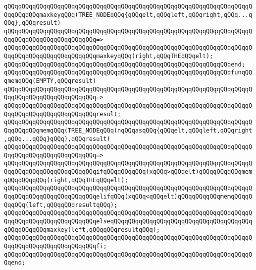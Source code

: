 \newline
\verb|qQQqqQQqqQQqqQQqqQQqqQQqqQQqqQQqqQQqqQQqqQQqqQQqqQQqqQQqqQQqqQQqqQQqqQQqqQQqqQQqmaxkeyqQQq(TREE_NODEqQQq{qQQqelt,qQQqleft,qQQqright,qQQq...qQQq},qQQqresult)|\newline
\verb|qQQqqQQqqQQqqQQqqQQqqQQqqQQqqQQqqQQqqQQqqQQqqQQqqQQqqQQqqQQqqQQqqQQqqQQqqQQqqQQqqQQqqQQqqQQqqQQq=>|\newline
\verb|qQQqqQQqqQQqqQQqqQQqqQQqqQQqqQQqqQQqqQQqqQQqqQQqqQQqqQQqqQQqqQQqqQQqqQQqqQQqqQQqqQQqqQQqqQQqqQQqmaxkeyqQQq(right,qQQqTHEqQQqelt);|\newline
\verb|qQQqqQQqqQQqqQQqqQQqqQQqqQQqqQQqqQQqqQQqqQQqqQQqqQQqqQQqqQQqqQQqend;|\newline
\newline
\verb|qQQqqQQqqQQqqQQqqQQqqQQqqQQqqQQqqQQqqQQqqQQqqQQqqQQqqQQqqQQqqQQqfunqQQqmemqQQq(EMPTY,qQQqresult)|\newline
\verb|qQQqqQQqqQQqqQQqqQQqqQQqqQQqqQQqqQQqqQQqqQQqqQQqqQQqqQQqqQQqqQQqqQQqqQQqqQQqqQQqqQQqqQQqqQQqqQQq=>|\newline
\verb|qQQqqQQqqQQqqQQqqQQqqQQqqQQqqQQqqQQqqQQqqQQqqQQqqQQqqQQqqQQqqQQqqQQqqQQqqQQqqQQqqQQqqQQqqQQqqQQqresult;|\newline
\newline
\verb|qQQqqQQqqQQqqQQqqQQqqQQqqQQqqQQqqQQqqQQqqQQqqQQqqQQqqQQqqQQqqQQqqQQqqQQqqQQqqQQqmemqQQq(TREE_NODEqQQq(nqQQqasqQQq{qQQqelt,qQQqleft,qQQqright,qQQq...qQQq}qQQq),qQQqresult)|\newline
\verb|qQQqqQQqqQQqqQQqqQQqqQQqqQQqqQQqqQQqqQQqqQQqqQQqqQQqqQQqqQQqqQQqqQQqqQQqqQQqqQQqqQQqqQQqqQQqqQQq=>|\newline
\verb|qQQqqQQqqQQqqQQqqQQqqQQqqQQqqQQqqQQqqQQqqQQqqQQqqQQqqQQqqQQqqQQqqQQqqQQqqQQqqQQqqQQqqQQqqQQqqQQqifqQQqqQQqqQQq(xqQQq>qQQqelt)qQQqqQQqqQQqmemqQQqqQQqqQQq(right,qQQqTHEqQQqelt);|\newline
\verb|qQQqqQQqqQQqqQQqqQQqqQQqqQQqqQQqqQQqqQQqqQQqqQQqqQQqqQQqqQQqqQQqqQQqqQQqqQQqqQQqqQQqqQQqqQQqqQQqelifqQQq(xqQQq<qQQqelt)qQQqqQQqqQQqmemqQQqqQQqqQQq(left,qQQqqQQqresultqQQq);|\newline
\verb|qQQqqQQqqQQqqQQqqQQqqQQqqQQqqQQqqQQqqQQqqQQqqQQqqQQqqQQqqQQqqQQqqQQqqQQqqQQqqQQqqQQqqQQqqQQqqQQqelseqQQqqQQqqQQqqQQqqQQqqQQqqQQqqQQqqQQqqQQqqQQqqQQqqQQqmaxkey(left,qQQqqQQqresultqQQq);|\newline
\verb|qQQqqQQqqQQqqQQqqQQqqQQqqQQqqQQqqQQqqQQqqQQqqQQqqQQqqQQqqQQqqQQqqQQqqQQqqQQqqQQqqQQqqQQqqQQqqQQqfi;|\newline
\verb|qQQqqQQqqQQqqQQqqQQqqQQqqQQqqQQqqQQqqQQqqQQqqQQqqQQqqQQqqQQqqQQqqQQqqQQqend;|\newline
